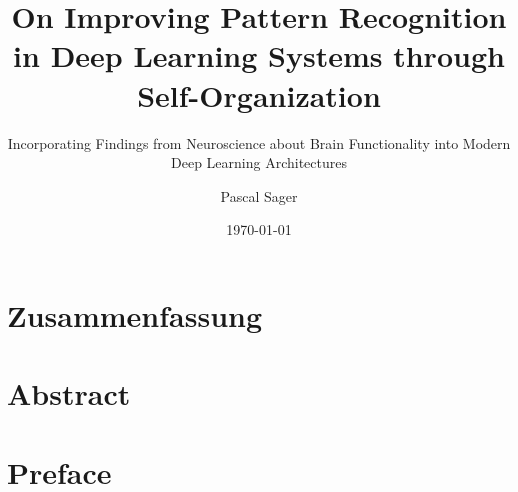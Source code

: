 \documentclass[
    fontsize=10pt,
    twoside=true,
    numbers=noenddot
]{cls/phdbyphd}
\begin{document}

\titlehead{Master of Science in Engineering with Specialisation in Data Science}

\subject{Master Thesis}
\title[On Improving Pattern Recognition in Deep Learning Systems through Self-Organization]{
    On Improving Pattern Recognition in Deep Learning Systems through Self-Organization
}
\subtitle{Incorporating Findings from Neuroscience about Brain Functionality into Modern Deep Learning Architectures}

\author[Pascal Sager]{Pascal Sager}
\date{\today}

\publishers{Zurich University of Applied Sciences}

\frontmatter
{}

\dedication{
	Dedicated to the dedicated.\\
	\flushright -- Pascal Sager
}

\maketitle


\chapter*{Zusammenfassung}
    
    
\chapter*{Abstract}
    

\chapter*{Preface}
    
\end{document}
